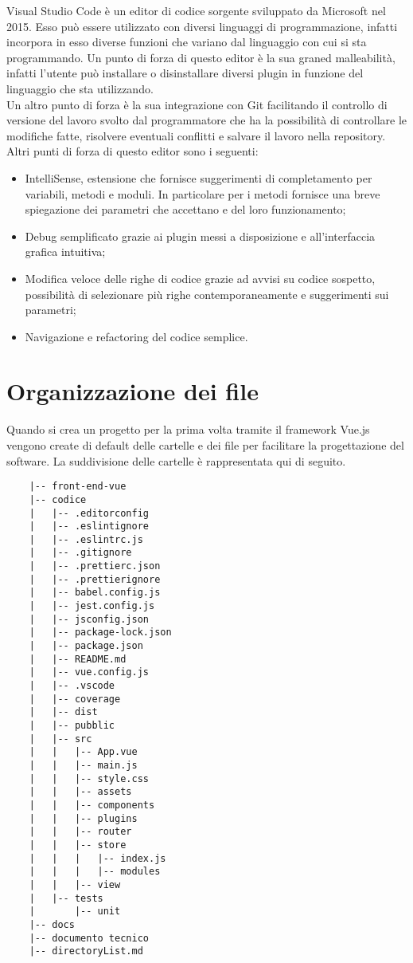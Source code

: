 Visual Studio Code è un editor di codice sorgente sviluppato da Microsoft nel 2015. Esso può essere utilizzato con diversi linguaggi di programmazione, infatti incorpora in esso diverse funzioni che variano dal linguaggio con cui si sta programmando. Un punto di forza di questo editor è la sua graned malleabilità, infatti l'utente può installare o disinstallare diversi plugin in funzione del linguaggio che sta utilizzando.\\
Un altro punto di forza è la sua integrazione con Git facilitando il controllo di versione del lavoro svolto dal programmatore che ha la possibilità di controllare le modifiche fatte, risolvere eventuali conflitti e salvare il lavoro nella repository. Altri punti di forza di questo editor sono i seguenti:
\begin{itemize}
	\item IntelliSense, estensione che fornisce suggerimenti di completamento per variabili, metodi e moduli. In particolare per i metodi fornisce una breve spiegazione dei parametri che accettano e del loro funzionamento;
	\item Debug semplificato grazie ai plugin messi a disposizione e all'interfaccia grafica intuitiva;
	\item Modifica veloce delle righe di codice grazie ad avvisi su codice sospetto, possibilità di selezionare più righe contemporaneamente e suggerimenti sui parametri;
	\item Navigazione e refactoring del codice semplice.
\end{itemize}

\section{Organizzazione dei file}
Quando si crea un progetto per la prima volta tramite il framework Vue.js vengono create di default delle cartelle e dei file per facilitare la progettazione del software. La suddivisione delle cartelle è rappresentata qui di seguito.

\begin{lstlisting}
	|-- front-end-vue
	|-- codice
	|   |-- .editorconfig
	|   |-- .eslintignore
	|   |-- .eslintrc.js
	|   |-- .gitignore
	|   |-- .prettierc.json
	|   |-- .prettierignore
	|   |-- babel.config.js
	|   |-- jest.config.js
	|   |-- jsconfig.json
	|   |-- package-lock.json
	|   |-- package.json
	|   |-- README.md
	|   |-- vue.config.js
	|   |-- .vscode
	|   |-- coverage
	|   |-- dist
	|   |-- pubblic
	|   |-- src
	|   |   |-- App.vue
	|   |   |-- main.js
	|   |   |-- style.css
	|   |   |-- assets
	|   |   |-- components
	|   |   |-- plugins
	|   |   |-- router
	|   |   |-- store
	|   |   |   |-- index.js
	|   |   |   |-- modules
	|   |   |-- view
	|   |-- tests
	|       |-- unit
	|-- docs
	|-- documento tecnico
	|-- directoryList.md
\end{lstlisting}

